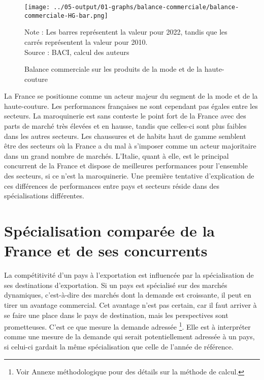 \documentclass[french,10pt,a4paper]{article}
\begin{document}
\begin{figure}[!h]
  \centering
  \texttt{[image: ../05-output/01-graphs/balance-commerciale/balance-commerciale-HG-bar.png]}
  \captionsetup{justification=justified, singlelinecheck=false, font=small}
  \caption*{Note : Les barres représentent la valeur pour 2022, tandis que les carrés représentent la valeur pour 2010. \\
  Source : BACI, calcul des auteurs}
  \captionsetup{justification=centering, singlelinecheck=true, font=normalsize}
  \caption{Balance commerciale sur les produits de la mode et de la haute-couture}
  \label{fig:balance-commerciale}
\end{figure}

\bigskip

La France se positionne comme un acteur majeur du segment de la mode et de la haute-couture. Les performances françaises ne sont cependant pas égales entre les secteurs. La maroquinerie est sans conteste le point fort de la France avec des parts de marché très élevées et en hausse, tandis que celles-ci sont plus faibles dans les autres secteurs. Les chaussures et de habits haut de gamme semblent être des secteurs où la France a du mal à s'imposer comme un acteur majoritaire dans un grand nombre de marchés. L'Italie, quant à elle, est le principal concurrent de la France et dispose de meilleures performances pour l'ensemble des secteurs, si ce n'est la maroquinerie. Une première tentative d'explication de ces différences de performances entre pays et secteurs réside dans des spécialisations différentes.


\section{Spécialisation comparée de la France et de ses concurrents}


La compétitivité d'un pays à l'exportation est influencée par la spécialisation de ses destinations d'exportation. Si un pays est spécialisé sur des marchés dynamiques, c'est-à-dire des marchés dont la demande est croissante, il peut en tirer un avantage commercial. Cet avantage n'est pas certain, car il faut arriver à se faire une place dans le pays de destination, mais les perspectives sont prometteuses. C'est ce que mesure la demande adressée \footnote{Voir Annexe méthodologique pour des détails sur la méthode de calcul.}. Elle est à interpréter comme une mesure de la demande qui serait potentiellement adressée à un pays, si celui-ci gardait la même spécialisation que celle de l'année de référence.
\end{document}
